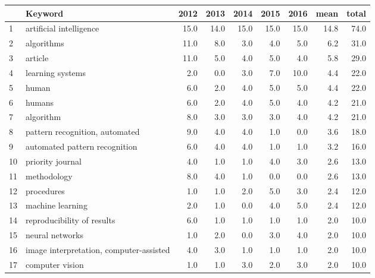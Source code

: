 \begin{tabular}{llrrrrrrr}
\toprule
{} &                                  Keyword &  2012 &  2013 &  2014 &  2015 &  2016 &  mean &  total \\
\midrule
1  &                  artificial intelligence &  15.0 &  14.0 &  15.0 &  15.0 &  15.0 &  14.8 &   74.0 \\
2  &                               algorithms &  11.0 &   8.0 &   3.0 &   4.0 &   5.0 &   6.2 &   31.0 \\
3  &                                  article &  11.0 &   5.0 &   4.0 &   5.0 &   4.0 &   5.8 &   29.0 \\
4  &                         learning systems &   2.0 &   0.0 &   3.0 &   7.0 &  10.0 &   4.4 &   22.0 \\
5  &                                    human &   6.0 &   2.0 &   4.0 &   5.0 &   5.0 &   4.4 &   22.0 \\
6  &                                   humans &   6.0 &   2.0 &   4.0 &   5.0 &   4.0 &   4.2 &   21.0 \\
7  &                                algorithm &   8.0 &   3.0 &   3.0 &   3.0 &   4.0 &   4.2 &   21.0 \\
8  &           pattern recognition, automated &   9.0 &   4.0 &   4.0 &   1.0 &   0.0 &   3.6 &   18.0 \\
9  &            automated pattern recognition &   6.0 &   4.0 &   4.0 &   1.0 &   1.0 &   3.2 &   16.0 \\
10 &                         priority journal &   4.0 &   1.0 &   1.0 &   4.0 &   3.0 &   2.6 &   13.0 \\
11 &                              methodology &   8.0 &   4.0 &   1.0 &   0.0 &   0.0 &   2.6 &   13.0 \\
12 &                               procedures &   1.0 &   1.0 &   2.0 &   5.0 &   3.0 &   2.4 &   12.0 \\
13 &                         machine learning &   2.0 &   1.0 &   0.0 &   4.0 &   5.0 &   2.4 &   12.0 \\
14 &               reproducibility of results &   6.0 &   1.0 &   1.0 &   1.0 &   1.0 &   2.0 &   10.0 \\
15 &                          neural networks &   1.0 &   2.0 &   0.0 &   3.0 &   4.0 &   2.0 &   10.0 \\
16 &  image interpretation, computer-assisted &   4.0 &   3.0 &   1.0 &   1.0 &   1.0 &   2.0 &   10.0 \\
17 &                          computer vision &   1.0 &   1.0 &   3.0 &   2.0 &   3.0 &   2.0 &   10.0 \\

\end{tabular}
